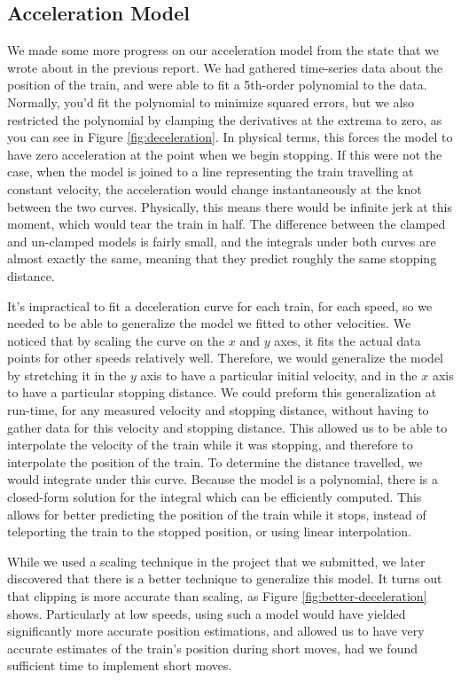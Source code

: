 \documentclass{article}
\begin{document}
\subsection{Acceleration Model}
We made some more progress on our acceleration model from the state that we wrote about in the previous report.
We had gathered time-series data about the position of the train, and were able to fit a 5th-order polynomial to
the data.
Normally, you'd fit the polynomial to minimize squared errors, but we also restricted the polynomial by clamping
the derivatives at the extrema to zero, as you can see in Figure \ref{fig:deceleration}.
In physical terms, this forces the model to have zero acceleration at the point
when we begin stopping.
If this were not the case, when the model is joined to a line representing
the train travelling at constant velocity, the acceleration would change instantaneously
at the knot between the two curves.
Physically, this means there would be infinite jerk at this moment, which would tear the
train in half.
The difference between the clamped and un-clamped models is fairly small, and the
integrals under both curves are almost exactly the same, meaning that they predict
roughly the same stopping distance.

It's impractical to fit a deceleration curve for each train, for each speed,
so we needed to be able to generalize the model we fitted to other velocities.
We noticed that by scaling the curve on the $x$ and $y$ axes, it fits
the actual data points for other speeds relatively well.
Therefore, we would generalize the model by stretching it in the $y$ axis
to have a particular initial velocity, and in the $x$ axis to have a particular
stopping distance.
We could preform this generalization at run-time, for any measured velocity and
stopping distance, without having to gather data for this velocity and stopping distance.
This allowed us to be able to interpolate the velocity of the train while
it was stopping, and therefore to interpolate the position of the train.
To determine the distance travelled, we would integrate under this curve.
Because the model is a polynomial, there is a closed-form solution
for the integral which can be efficiently computed.
This allows for better predicting the position of the train
while it stops, instead of teleporting the train to the stopped position,
or using linear interpolation.

While we used a scaling technique in the project that we submitted, we later
discovered that there is a better technique to generalize this model. It
turns out that clipping is more accurate than scaling, as
Figure \ref{fig:better-deceleration} shows. Particularly at low speeds, using
such a model would have yielded significantly more accurate position
estimations, and allowed us to have very accurate estimates of the train's
position during short moves, had we found sufficient time to implement short
moves.
\end{document}
